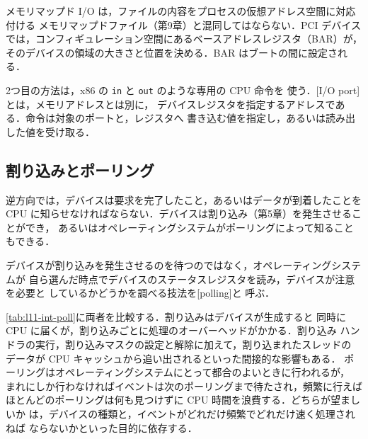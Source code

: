 \documentclass[../main.tex]{subfiles}
\begin{document}
メモリマップド I/O は，ファイルの内容をプロセスの仮想アドレス空間に対応付ける
メモリマップドファイル（第9章）と混同してはならない．PCI デバイス
では，コンフィギュレーション空間にあるベースアドレスレジスタ（BAR）が，
そのデバイスの領域の大きさと位置を決める．BAR はブートの間に設定される．

2つ目の方法は，x86 の \texttt{in} と \texttt{out} のような専用の CPU 命令を
使う．[I/O port]とは，メモリアドレスとは別に，
デバイスレジスタを指定するアドレスである．命令は対象のポートと，レジスタへ
書き込む値を指定し，あるいは読み出した値を受け取る．

\subsection{割り込みとポーリング}

逆方向では，デバイスは要求を完了したこと，あるいはデータが到着したことを CPU
に知らせなければならない．デバイスは割り込み（第5章）を発生させることができ，
あるいはオペレーティングシステムがポーリングによって知ることもできる．

\begin{definition}[ポーリング]
  デバイスが割り込みを発生させるのを待つのではなく，オペレーティングシステムが
  自ら選んだ時点でデバイスのステータスレジスタを読み，デバイスが注意を必要と
  しているかどうかを調べる技法を[polling]と
  呼ぶ．
\end{definition}

\cref{tab:l11-int-poll}に両者を比較する．割り込みはデバイスが生成すると
同時に CPU に届くが，割り込みごとに処理のオーバーヘッドがかかる．割り込み
ハンドラの実行，割り込みマスクの設定と解除に加えて，割り込まれたスレッドの
データが CPU キャッシュから追い出されるといった間接的な影響もある．
ポーリングはオペレーティングシステムにとって都合のよいときに行われるが，
まれにしか行わなければイベントは次のポーリングまで待たされ，頻繁に行えば
ほとんどのポーリングは何も見つけずに CPU 時間を浪費する．どちらが望ましいか
は，デバイスの種類と，イベントがどれだけ頻繁でどれだけ速く処理されねば
ならないかといった目的に依存する．
\end{document}
